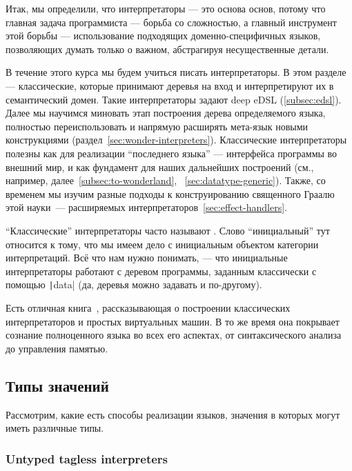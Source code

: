 
Итак, мы определили, что интерпретаторы --- это основа основ, потому что главная задача программиста --- борьба со сложностью, а главный инструмент этой борьбы --- использование подходящих доменно-специфичных языков, позволяющих думать только о важном, абстрагируя несущественные детали.

В течение этого курса мы будем учиться писать интерпретаторы.
В этом разделе --- классические, которые принимают деревья на вход и интерпретируют их в семантический домен.
Такие интерпретаторы задают deep eDSL (\ref{subsec:edsl}).
Далее мы научимся миновать этап построения дерева определяемого языка, полностью переиспользовать и напрямую расширять мета-язык новыми конструкциями (раздел~\ref{sec:wonder-interpreters}).
Классические интерпретаторы полезны как для реализации ``последнего языка'' --- интерфейса программы во внешний мир, и как фундамент для наших дальнейших построений (см., например, далее~\ref{subsec:to-wonderland}, ~\ref{sec:datatype-generic}).
Также, со временем мы изучим разные подходы к конструированию священного Граалю этой науки~--- расширяемых интерпретаторов~\ref{sec:effect-handlers}.

``Классические'' интерпретаторы часто называют .
Слово ``инициальный'' тут относится к тому, что мы имеем дело с инициальным объектом категории интерпретаций.
Всё что нам нужно понимать, --- что инициальные интерпретаторы работают с деревом программы, заданным классически с помощью \texttt|data| (да, деревья можно задавать и по-другому).

Есть отличная книга~\cite{nystrom2021crafting}, рассказывающая о построении классических интерпретаторов и простых виртуальных машин.
В то же время она покрывает сознание полноценного языка во всех его аспектах, от синтаксического анализа до управления памятью.

\subsection{Типы значений}

Рассмотрим, какие есть способы реализации языков, значения в которых могут иметь различные типы.

\subsubsection{Untyped tagless interpreters}

